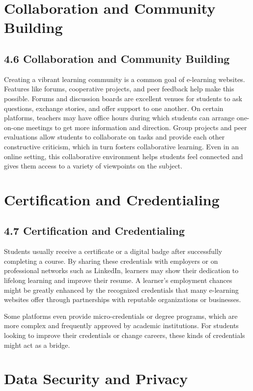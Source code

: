 \documentclass[BTech]{audiss}
\begin{document}
\section{Collaboration and Community Building}
\subsection{4.6 Collaboration and Community Building}
Creating a vibrant learning community is a common goal of e-learning websites. Features like forums, cooperative projects, and peer feedback help make this possible. Forums and discussion boards are excellent venues for students to ask questions, exchange stories, and offer support to one another. On certain platforms, teachers may have office hours during which students can arrange one-on-one meetings to get more information and direction. Group projects and peer evaluations allow students to collaborate on tasks and provide each other constructive criticism, which in turn fosters collaborative learning. Even in an online setting, this collaborative environment helps students feel connected and gives them access to a variety of viewpoints on the subject.

\section{Certification and Credentialing}
\subsection{4.7 Certification and Credentialing}
Students usually receive a certificate or a digital badge after successfully completing a course. By sharing these credentials with employers or on professional networks such as LinkedIn, learners may show their dedication to lifelong learning and improve their resume. A learner's employment chances might be greatly enhanced by the recognized credentials that many e-learning websites offer through partnerships with reputable organizations or businesses.

Some platforms even provide micro-credentials or degree programs, which are more complex and frequently approved by academic institutions. For students looking to improve their credentials or change careers, these kinds of credentials might act as a bridge.

\section{Data Security and Privacy}
\end{document}

